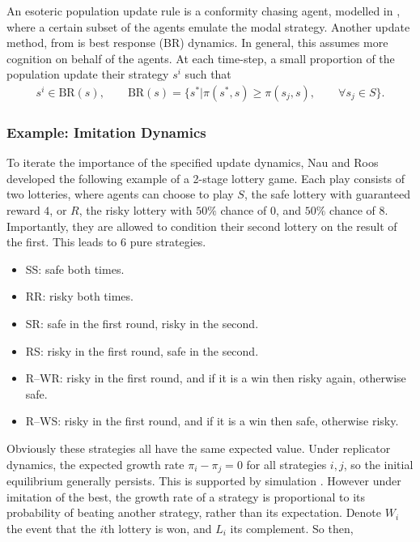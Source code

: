 An esoteric population update rule is a conformity chasing agent, modelled in \cite{RN23}, where a certain subset of the agents emulate the modal strategy. Another update method, from \cite{RN81} is best response (BR) dynamics. In general, this assumes more cognition on behalf of the agents. At each time-step, a small proportion of the population update their strategy $s^i$ such that 
\begin{align*}
    s^i \in \textrm{BR}(s), \qquad \textrm{BR}(s) = \{s^*| \pi(s^*,s) \geq \pi(s_j,s), \qquad \forall s_j \in S\}.
\end{align*}

\subsubsection{Example: Imitation Dynamics} \label{Lottery}
To iterate the importance of the specified update dynamics, Nau and Roos \cite{RN30} developed the following example of a 2-stage lottery game. Each play consists of two lotteries, where agents can choose to play $S$, the safe lottery with guaranteed reward $4$, or $R$, the risky lottery with $50\%$ chance of $0$, and $50\%$ chance of $8$. Importantly, they are allowed to condition their second lottery on the result of the first. This leads to 6 pure strategies. 
\begin{itemize}
    \item SS: safe both times. 
    \item RR: risky both times. 
    \item SR: safe in the first round, risky in the second. 
    \item RS: risky in the first round, safe in the second.
    \item R--WR: risky in the first round, and if it is a win then risky again, otherwise safe.
    \item R--WS: risky in the first round, and if it is a win then safe, otherwise risky.
\end{itemize}
Obviously these strategies all have the same expected value. Under replicator dynamics, the expected growth rate $\pi_i - \pi_j = 0$ for all strategies $i,j$, so the initial equilibrium generally persists. This is supported by simulation \cite{RN30}. However under imitation of the best, the growth rate of a strategy is proportional to its probability of beating another strategy, rather than its expectation. Denote $W_i$ the event that the $i$th lottery is won, and $L_i$ its complement. So then,\\
